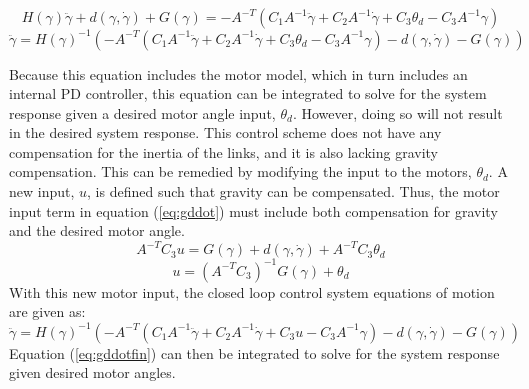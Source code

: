 \[
H(\gamma) \ddot{\gamma}+d(\gamma, \dot{\gamma})+G(\gamma)=-A^{-T}\left(C_1A^{-1} \ddot{\gamma}+C_2 A^{-1} \dot{\gamma}+C_3 \theta_{d}- C_3A^{-1} \gamma\right)
\]
\begin{equation}
\ddot{\gamma}=H(\gamma)^{-1}\left(-A^{-T}\left(C_1 A^{-1} \ddot{\gamma}+C_2 A^{-1} \dot{\gamma}+C_3 \theta_{d}-C_3A^{-1} \gamma\right)-d(\gamma, \dot{\gamma})-G(\gamma)\right)
\label{eq:gddot}
\end{equation}

Because this equation includes the motor model, which in turn includes an internal PD controller, this equation can be integrated to solve for the system response given a desired motor angle input, $\theta_d$. However, doing so will not result in the desired system response. This control scheme does not have any compensation for the inertia of the links, and it is also lacking gravity compensation. This can be remedied by modifying the input to the motors, $\theta_d$. A new input, $u$, is defined such that gravity can be compensated. Thus, the motor input term in equation (\ref{eq:gddot}) must include both compensation for gravity and the desired motor angle.
\[
A^{-T} C_3  u=G(\gamma)+d(\gamma, \dot{\gamma})+A^{-T} C_3\theta_{d}
\]
\begin{equation}
u=\left(A^{-T} C_3\right)^{-1} G(\gamma)+\theta_{d}
\end{equation}
With this new motor input, the closed loop control system equations of motion are given as:
\begin{equation}
\ddot{\gamma}=H(\gamma)^{-1}\left(-A^{-T}\left(C_1 A^{-1} \ddot{\gamma}+C_2 A^{-1} \dot{\gamma}+C_3 u-C_3A^{-1} \gamma\right)-d(\gamma, \dot{\gamma})-G(\gamma)\right)
\label{eq:gddotfin}
\end{equation}
Equation (\ref{eq:gddotfin}) can then be integrated to solve for the system response given desired motor angles.

